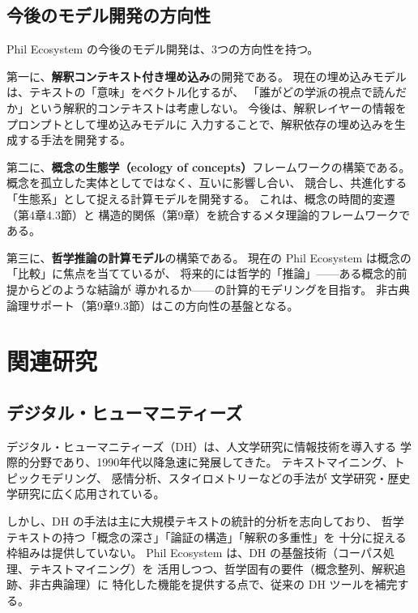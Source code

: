 \documentclass[a4paper,11pt]{ltjsarticle}
\begin{document}
\subsection{今後のモデル開発の方向性}

Phil Ecosystem の今後のモデル開発は、3つの方向性を持つ。

第一に、\textbf{解釈コンテキスト付き埋め込み}の開発である。
現在の埋め込みモデルは、テキストの「意味」をベクトル化するが、
「誰がどの学派の視点で読んだか」という解釈的コンテキストは考慮しない。
今後は、解釈レイヤーの情報をプロンプトとして埋め込みモデルに
入力することで、解釈依存の埋め込みを生成する手法を開発する。

第二に、\textbf{概念の生態学（ecology of concepts）}フレームワークの構築である。
概念を孤立した実体としてではなく、互いに影響し合い、
競合し、共進化する「生態系」として捉える計算モデルを開発する。
これは、概念の時間的変遷（第4章4.3節）と
構造的関係（第9章）を統合するメタ理論的フレームワークである。

第三に、\textbf{哲学推論の計算モデル}の構築である。
現在の Phil Ecosystem は概念の「比較」に焦点を当てているが、
将来的には哲学的「推論」——ある概念的前提からどのような結論が
導かれるか——の計算的モデリングを目指す。
非古典論理サポート（第9章9.3節）はこの方向性の基盤となる。


\section{関連研究}\label{sec:related}

\subsection{デジタル・ヒューマニティーズ}

デジタル・ヒューマニティーズ（DH）は、人文学研究に情報技術を導入する
学際的分野であり、1990年代以降急速に発展してきた\cite{burdick2012}。
テキストマイニング、トピックモデリング\cite{blei2003}、
感情分析、スタイロメトリーなどの手法が
文学研究・歴史学研究に広く応用されている。

しかし、DH の手法は主に大規模テキストの統計的分析を志向しており、
哲学テキストの持つ「概念の深さ」「論証の構造」「解釈の多重性」を
十分に捉える枠組みは提供していない。
Phil Ecosystem は、DH の基盤技術（コーパス処理、テキストマイニング）を
活用しつつ、哲学固有の要件（概念整列、解釈追跡、非古典論理）に
特化した機能を提供する点で、従来の DH ツールを補完する。
\end{document}
